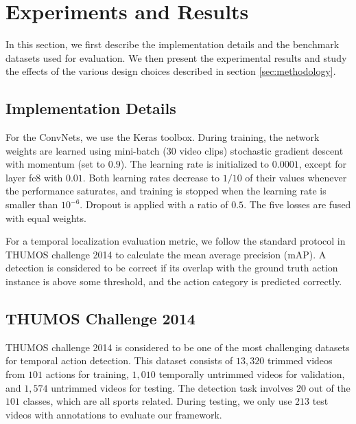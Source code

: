 \documentclass[10pt,twocolumn,letterpaper]{article}
\begin{document}
\section{Experiments and Results}
\label{sec:experiments}
In this section, we first describe the implementation details and the benchmark datasets used for evaluation. We then present the experimental results and study the effects of the various design choices described in section \ref{sec:methodology}. 

\subsection{Implementation Details}
For the ConvNets, we use the Keras toolbox.
During training, the network weights are learned using mini-batch ($30$ video clips) stochastic gradient descent with momentum (set to $0.9$). The learning rate is initialized to $0.0001$, except for layer \textsf{fc8} with $0.01$. Both learning rates decrease to $1/10$ of their values whenever the performance saturates, and training is stopped when the learning rate is smaller than $10^{-6}$. Dropout is applied with a ratio of $0.5$. The five losses are fused with equal weights.

For a temporal localization evaluation metric, we follow the standard protocol in THUMOS challenge 2014 to calculate the mean average precision (mAP). A detection is considered to be correct if its overlap with the ground truth action instance is above some threshold, and the action category is predicted correctly.

\subsection{THUMOS Challenge 2014}
THUMOS challenge 2014 is considered to be one of the most challenging datasets for temporal action detection. This dataset consists of $13,320$ trimmed videos from $101$ actions for training, $1,010$ temporally untrimmed videos for validation, and $1,574$ untrimmed videos for testing. The detection task involves $20$ out of the $101$ classes, which are all sports related. During testing, we only use $213$ test videos with annotations to evaluate our framework.
\end{document}
